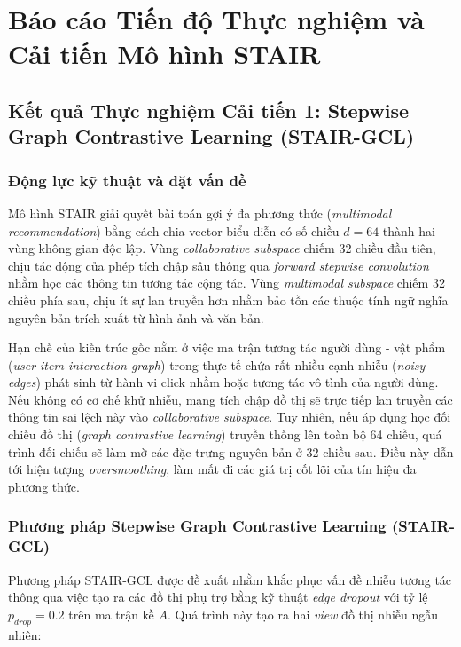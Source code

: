 \section{Báo cáo Tiến độ Thực nghiệm và Cải tiến Mô hình STAIR}

\subsection{Kết quả Thực nghiệm Cải tiến 1: Stepwise Graph Contrastive Learning (STAIR-GCL)}

\subsubsection{Động lực kỹ thuật và đặt vấn đề}

Mô hình STAIR giải quyết bài toán gợi ý đa phương thức (\textit{multimodal recommendation}) bằng cách chia vector biểu diễn có số chiều $d=64$ thành hai vùng không gian độc lập. Vùng \textit{collaborative subspace} chiếm 32 chiều đầu tiên, chịu tác động của phép tích chập sâu thông qua \textit{forward stepwise convolution} nhằm học các thông tin tương tác cộng tác. Vùng \textit{multimodal subspace} chiếm 32 chiều phía sau, chịu ít sự lan truyền hơn nhằm bảo tồn các thuộc tính ngữ nghĩa nguyên bản trích xuất từ hình ảnh và văn bản.

Hạn chế của kiến trúc gốc nằm ở việc ma trận tương tác người dùng - vật phẩm (\textit{user-item interaction graph}) trong thực tế chứa rất nhiều cạnh nhiễu (\textit{noisy edges}) phát sinh từ hành vi click nhầm hoặc tương tác vô tình của người dùng. Nếu không có cơ chế khử nhiễu, mạng tích chập đồ thị sẽ trực tiếp lan truyền các thông tin sai lệch này vào \textit{collaborative subspace}. Tuy nhiên, nếu áp dụng học đối chiếu đồ thị (\textit{graph contrastive learning}) truyền thống lên toàn bộ 64 chiều, quá trình đối chiếu sẽ làm mờ các đặc trưng nguyên bản ở 32 chiều sau. Điều này dẫn tới hiện tượng \textit{oversmoothing}, làm mất đi các giá trị cốt lõi của tín hiệu đa phương thức.

\subsubsection{Phương pháp Stepwise Graph Contrastive Learning (STAIR-GCL)}

Phương pháp STAIR-GCL được đề xuất nhằm khắc phục vấn đề nhiễu tương tác thông qua việc tạo ra các đồ thị phụ trợ bằng kỹ thuật \textit{edge dropout} với tỷ lệ $p_{drop}=0.2$ trên ma trận kề $A$. Quá trình này tạo ra hai \textit{view} đồ thị nhiễu ngẫu nhiên:

